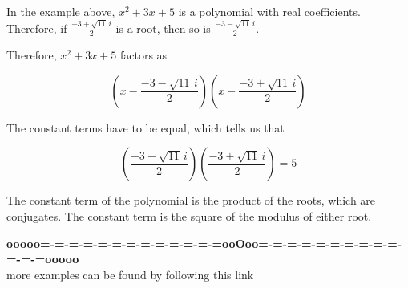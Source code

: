 \documentclass{ximera}
\begin{document}
\begin{observation}

In the example above, $x^2 + 3x + 5$ is a polynomial with real coefficients.  Therefore, if $\frac{-3 + \sqrt{11} \, i}{2}$ is a root, then so is $\frac{-3 - \sqrt{11} \, i}{2}$.



Therefore, $x^2 + 3x + 5$ factors as



\[ \left( x - \frac{-3 - \sqrt{11} \, i}{2} \right)  \left( x - \frac{-3 + \sqrt{11} \, i}{2} \right)    \]


The constant terms have to be equal, which tells us that 


\[    \left( \frac{-3 - \sqrt{11} \, i}{2} \right)  \left( \frac{-3 + \sqrt{11} \, i}{2} \right)  = 5    \]




The constant term of the polynomial is the product of the roots, which are conjugates.  The constant term is the square of the modulus of either root.





\end{observation}













\begin{center}
\textbf{\textcolor{green!50!black}{ooooo=-=-=-=-=-=-=-=-=-=-=-=-=ooOoo=-=-=-=-=-=-=-=-=-=-=-=-=ooooo}} \\

more examples can be found by following this link\\ 

\end{center}
\end{document}
